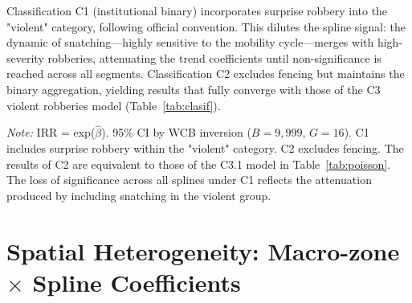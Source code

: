 \documentclass[pdflatex,sn-basic]{sn-jnl}
\newcommand{\tablenote}[1]{%
  \vspace{2pt}%
  {\par\footnotesize\textit{Note:} #1\par}%
}
\begin{document}
Classification C1 (institutional binary) incorporates surprise robbery into the "violent" category, following official convention. This dilutes the spline signal: the dynamic of snatching---highly sensitive to the mobility cycle---merges with high-severity robberies, attenuating the trend coefficients until non-significance is reached across all segments. Classification C2 excludes fencing but maintains the binary aggregation, yielding results that fully converge with those of the C3 violent robberies model (Table~\ref{tab:clasif}).

\begin{table}[htbp]
\centering
\caption{Comparison of Poisson-QMLE results by binary classification}
\label{tab:clasif}
\footnotesize
{}
\tablenote{IRR = exp($\hat{\beta}$). 95\% CI by WCB inversion ($B=9,999$, $G=16$). C1 includes surprise robbery within the "violent" category. C2 excludes fencing. The results of C2 are equivalent to those of the C3.1 model in Table~\ref{tab:poisson}. The loss of significance across all splines under C1 reflects the attenuation produced by including snatching in the violent group.}
\end{table}

\clearpage
\section{Spatial Heterogeneity: Macro-zone \texorpdfstring{$\times$}{x} Spline Coefficients}
\label{ap:macro}
\end{document}
